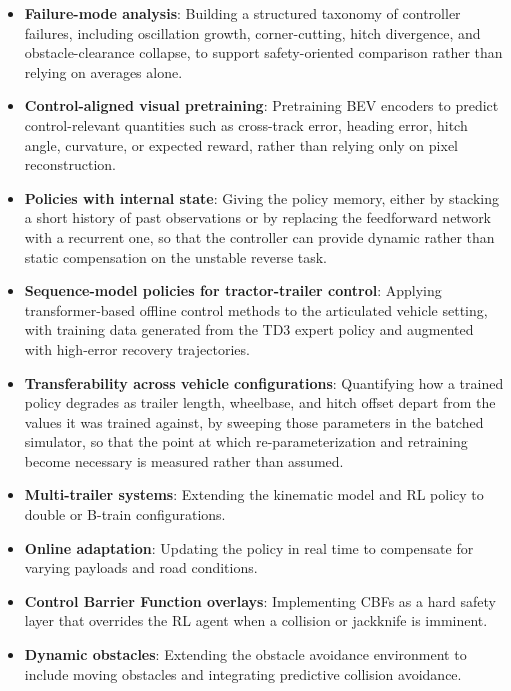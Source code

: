 \begin{itemize}
    \item \textbf{Failure-mode analysis}: Building a structured taxonomy of controller failures, including oscillation growth, corner-cutting, hitch divergence, and obstacle-clearance collapse, to support safety-oriented comparison rather than relying on averages alone.
    \item \textbf{Control-aligned visual pretraining}: Pretraining BEV encoders to predict control-relevant quantities such as cross-track error, heading error, hitch angle, curvature, or expected reward, rather than relying only on pixel reconstruction.
    \item \textbf{Policies with internal state}: Giving the policy memory, either by stacking a short history of past observations or by replacing the feedforward network with a recurrent one, so that the controller can provide dynamic rather than static compensation on the unstable reverse task.
    \item \textbf{Sequence-model policies for tractor-trailer control}: Applying transformer-based offline control methods to the articulated vehicle setting, with training data generated from the TD3 expert policy and augmented with high-error recovery trajectories.
    \item \textbf{Transferability across vehicle configurations}: Quantifying how a trained policy degrades as trailer length, wheelbase, and hitch offset depart from the values it was trained against, by sweeping those parameters in the batched simulator, so that the point at which re-parameterization and retraining become necessary is measured rather than assumed.
    \item \textbf{Multi-trailer systems}: Extending the kinematic model and RL policy to double or B-train configurations.
    \item \textbf{Online adaptation}: Updating the policy in real time to compensate for varying payloads and road conditions.
    \item \textbf{Control Barrier Function overlays}: Implementing CBFs as a hard safety layer that overrides the RL agent when a collision or jackknife is imminent.
    \item \textbf{Dynamic obstacles}: Extending the obstacle avoidance environment to include moving obstacles and integrating predictive collision avoidance.
\end{itemize}
